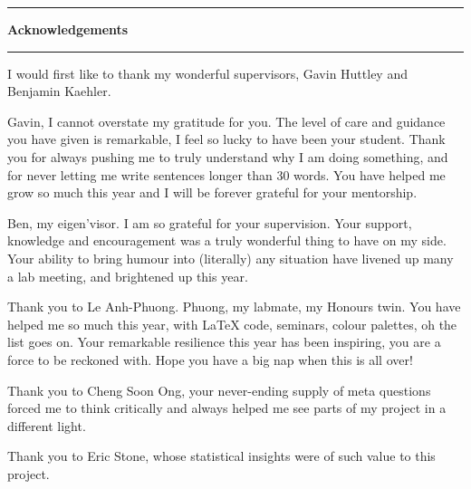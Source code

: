 \thispagestyle{plain}
\begin{center}
    \vspace{0.8cm}
    \rule{18cm}{0.5pt}
    \raggedright
    
    \huge

    \textbf{Acknowledgements}\\
    \rule{18cm}{0.5pt}
    
    \vspace{1.4cm}
    
    \normalsize
    
    I would first like to thank my wonderful supervisors, Gavin Huttley and Benjamin Kaehler. 
    
    \vspace{0.4cm}
    
    Gavin, I cannot overstate my gratitude for you. The level of care and guidance you have given is remarkable, I feel so lucky to have been your student. Thank you for always pushing me to truly understand why I am doing something, and for never letting me write sentences longer than 30 words. You have helped me grow so much this year and I will be forever grateful for your mentorship. 
    
    \vspace{0.4cm}
    
    Ben, my eigen'visor. I am so grateful for your supervision. Your support, knowledge and encouragement was a truly wonderful thing to have on my side. Your ability to bring humour into (literally) any situation have livened up many a lab meeting, and brightened up this year. 
    
    \vspace{0.4cm}    
    
        
    Thank you to Le Anh-Phuong. Phuong, my labmate, my Honours twin. You have helped me so much this year, with LaTeX code, seminars, colour palettes, oh the list goes on. Your remarkable resilience this year has been inspiring, you are a force to be reckoned with. Hope you have a big nap when this is all over!
    
    \vspace{0.4cm}  
    
    Thank you to Cheng Soon Ong, your never-ending supply of meta questions forced me to think critically and always helped me see parts of my project in a different light.
    
    \vspace{0.4cm}  
    
    Thank you to Eric Stone, whose statistical insights were of such value to this project. 


\end{center}
